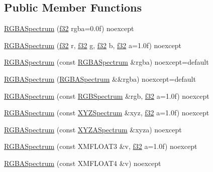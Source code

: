 \subsection*{Public Member Functions}
\begin{DoxyCompactItemize}
\item 
\hyperlink{structmage_1_1_r_g_b_a_spectrum_ac40872d8e9de6848ab85353640ed4c6a}{R\+G\+B\+A\+Spectrum} (\hyperlink{namespacemage_a6a44ad388483959dc4dff9f2aef91431}{f32} rgba=0.\+0f) noexcept
\item 
\hyperlink{structmage_1_1_r_g_b_a_spectrum_a1fde01ee4da8d45c5eb7e9502ff89c4c}{R\+G\+B\+A\+Spectrum} (\hyperlink{namespacemage_a6a44ad388483959dc4dff9f2aef91431}{f32} r, \hyperlink{namespacemage_a6a44ad388483959dc4dff9f2aef91431}{f32} g, \hyperlink{namespacemage_a6a44ad388483959dc4dff9f2aef91431}{f32} b, \hyperlink{namespacemage_a6a44ad388483959dc4dff9f2aef91431}{f32} a=1.\+0f) noexcept
\item 
\hyperlink{structmage_1_1_r_g_b_a_spectrum_add56e3d1cae8f0f170ffd5c950409d12}{R\+G\+B\+A\+Spectrum} (const \hyperlink{structmage_1_1_r_g_b_a_spectrum}{R\+G\+B\+A\+Spectrum} \&rgba) noexcept=default
\item 
\hyperlink{structmage_1_1_r_g_b_a_spectrum_ac53917f6129baafb04d812fcef6e4f56}{R\+G\+B\+A\+Spectrum} (\hyperlink{structmage_1_1_r_g_b_a_spectrum}{R\+G\+B\+A\+Spectrum} \&\&rgba) noexcept=default
\item 
\hyperlink{structmage_1_1_r_g_b_a_spectrum_ab338627fcbc579dd78f7e1fde38adf0c}{R\+G\+B\+A\+Spectrum} (const \hyperlink{structmage_1_1_r_g_b_spectrum}{R\+G\+B\+Spectrum} \&rgb, \hyperlink{namespacemage_a6a44ad388483959dc4dff9f2aef91431}{f32} a=1.\+0f) noexcept
\item 
\hyperlink{structmage_1_1_r_g_b_a_spectrum_a36a4f4f1aa46540ed3f7b44dda8fbabd}{R\+G\+B\+A\+Spectrum} (const \hyperlink{structmage_1_1_x_y_z_spectrum}{X\+Y\+Z\+Spectrum} \&xyz, \hyperlink{namespacemage_a6a44ad388483959dc4dff9f2aef91431}{f32} a=1.\+0f) noexcept
\item 
\hyperlink{structmage_1_1_r_g_b_a_spectrum_a04aab6648f23cc920973aa396edd2b58}{R\+G\+B\+A\+Spectrum} (const \hyperlink{structmage_1_1_x_y_z_a_spectrum}{X\+Y\+Z\+A\+Spectrum} \&xyza) noexcept
\item 
\hyperlink{structmage_1_1_r_g_b_a_spectrum_a0b290dcd7d393a971b47535c0a817ea6}{R\+G\+B\+A\+Spectrum} (const X\+M\+F\+L\+O\+A\+T3 \&v, \hyperlink{namespacemage_a6a44ad388483959dc4dff9f2aef91431}{f32} a=1.\+0f) noexcept
\item 
\hyperlink{structmage_1_1_r_g_b_a_spectrum_ae6c70539a602c52a9952a2c1fa5fa2ed}{R\+G\+B\+A\+Spectrum} (const X\+M\+F\+L\+O\+A\+T4 \&v) noexcept

\end{DoxyCompactItemize}
